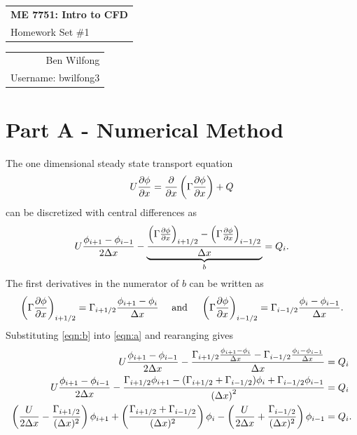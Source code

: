 \documentclass[reqno]{amsart}
\def\name{Ben Wilfong} %
\def\ID{bwilfong3} %
\begin{document}
	\noindent
	\thispagestyle{firststyle}
	\begin{tabular}{l}
		{\LARGE \textbf{ME 7751: Intro to CFD} }\\
		{\Large Homework Set \#1}
	\end{tabular} \hfill \begin{tabular}{r}
		\name \\
		Username: \ID
	\end{tabular}
	\noindent\makebox[\linewidth]{\rule{\textwidth}{1pt}}

    \section{Part A - Numerical Method}
    \noindent The one dimensional steady state transport equation
    \begin{equation*}
        U\pdiff[\phi]{x} = \pdiff{x}\left(\Gamma \pdiff[\phi]{x}\right) + Q
    \end{equation*}
    can be discretized with central differences as
    \begin{equation}
        U\frac{\phi_{i + 1} - \phi_{i - 1}}{2\Delta x} - \underbrace{\frac{\left(\Gamma\pdiff[\phi]{x}\right)_{i + 1/2} - \left(\Gamma \pdiff[\phi]{x}\right)_{i - 1/2}}{\Delta x}}_{b} = Q_i.
    \label{eqn:a}
    \end{equation}
    The first derivatives in the numerator of $b$ can be written as
    \begin{equation}
        \left(\Gamma\pdiff[\phi]{x}\right)_{i + 1/2} = \Gamma_{i + 1/2}\frac{\phi_{i + 1} - \phi_{i}}{\Delta x}\quad \text{ and  }\quad \left(\Gamma\pdiff[\phi]{x}\right)_{i - 1/2} = \Gamma_{i - 1/2}\frac{\phi_{i} - \phi_{i-1}}{\Delta x}.
    \label{eqn:b}
    \end{equation}
    Substituting \cref{eqn:b} into \cref{eqn:a} and rearanging gives
    \begin{align}
    U\frac{\phi_{i + 1} - \phi_{i - 1}}{2\Delta x} -
    \frac{\Gamma_{i + 1/2}\frac{\phi_{i + 1} - \phi_{i}}{\Delta x} - \Gamma_{i - 1/2}\frac{\phi_{i} - \phi_{i - 1}}{\Delta x}}{\Delta x} & = Q_i \notag \\
    U\frac{\phi_{i + 1} - \phi_{i - 1}}{2\Delta x} -
    \frac{\Gamma_{i + 1/2}\phi_{i + 1} - (\Gamma_{i + 1/2} + \Gamma_{i - 1/2})\phi_{i} + \Gamma_{i - 1/2}\phi_{i -1}}{\left(\Delta x\right)^2} &= Q_i \notag \\
    \left(\frac{U}{2\Delta x} - \frac{\Gamma_{i + 1/2}}{(\Delta x)^2}\right)\phi_{i + 1} +
    \left(\frac{\Gamma_{i + 1/2} + \Gamma_{i - 1/2}}{(\Delta x)^2}\right)\phi_i -
    \left(\frac{U}{2\Delta x} + \frac{\Gamma_{i - 1/2}}{(\Delta x)^2}\right)\phi_{i - 1} &= Q_i \label{eqn:c}.
    \end{align}
\end{document}
